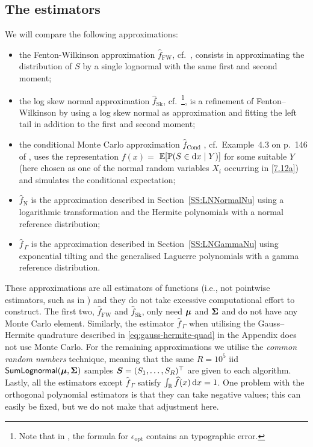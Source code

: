 \subsection{The estimators}
We will compare the following approximations:
\begin{itemize}
\item the Fenton-Wilkinson approximation $\widehat{f}_{\mathrm{FW}}$, cf.\ \cite{fenton1960sum}, consists in approximating the distribution of $S$ by a single lognormal
with the same first and second moment;
\item the log skew normal approximation $\widehat{f}_{\mathrm{Sk}}$,
cf.\ \cite{hcine2015highly}\footnote{Note that in \cite{hcine2015highly}, the formula for $\epsilon_{\mathrm{opt}}$ contains an typographic error.}, is a refinement of Fenton--Wilkinson by using a log  skew normal as approximation and fitting the left tail in addition to the first and second moment;
\item the conditional Monte Carlo approximation $\widehat{f}_{\mathrm{Cond}}$ , cf.\ Example~4.3 on p.\ 146 of \cite{asmussen2007stochastic}, uses the representation $f(x)=$
$\operatorname{{\mathbb E}}[\operatorname{{\mathbb P}}(S\in\mathop{}\!\mathrm{d} x \mid Y)]$ for some suitable $Y$ (here chosen as one of the
normal random variables $X_i$ occurring in \eqref{7.12a}) and simulates the conditional expectation;
\item $\widehat{f}_{\mathrm{N}}$ is the approximation described in Section~\ref{SS:LNNormalNu} using a logarithmic transformation
and the Hermite polynomials with a normal reference distribution;
\item $\widehat{f}_{\,\Gamma}$ is the approximation described in Section~\ref{SS:LNGammaNu} using exponential tilting and the generalised Laguerre polynomials with a gamma reference distribution.
\end{itemize}

These approximations are all estimators of functions (i.e., not pointwise estimators, such as in \cite{La15}) and they do not take excessive computational effort to construct. The first two, $\widehat{f}_{\mathrm{FW}}$ and $\widehat{f}_{\mathrm{Sk}}$, only need $\bm{\mu}$ and $\bm{\Sigma}$ and do not have any Monte Carlo element. Similarly, the estimator $\widehat{f}_{\,\Gamma}$ when utilising the Gauss--Hermite quadrature described in \eqref{eq:gauss-hermite-quad}
in the Appendix does not use Monte Carlo. For the remaining approximations we utilise the \emph{common random numbers} technique, meaning that the same $R=10^5$ iid $\mathsf{SumLognormal}(\bm{\mu}, \bm{\Sigma})$ samples $\bm{S} = (S_1, \dots, S_R)^\top$ are given to each algorithm. Lastly, all the estimators except $\widehat{f}_{\,\Gamma}$ satisfy $\int_{\mathbb{R}} \widehat{f}(x) \mathop{}\!\mathrm{d} x = 1$. One problem with the orthogonal polynomial estimators is that they can take negative values; this can easily be fixed, but we do not make that adjustment here.

